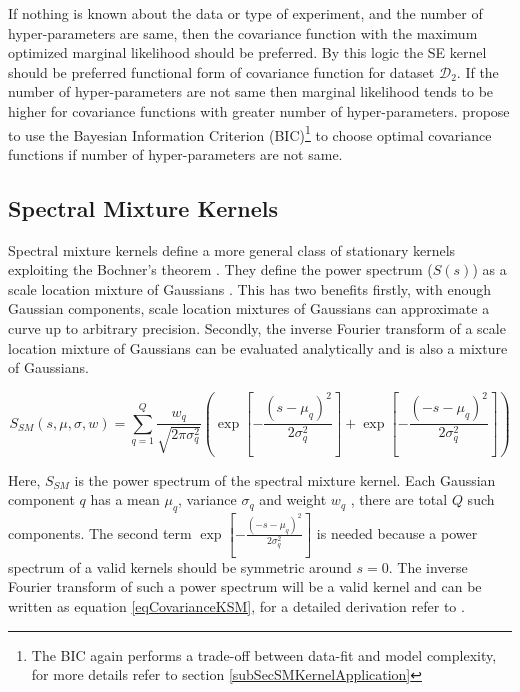 If nothing is known about the data or type of experiment, and the number of hyper-parameters are same, then the covariance function with the maximum optimized marginal likelihood should be preferred. By this logic the SE kernel should be preferred functional form of covariance function for dataset $\mathcal{D}_{2}$. If the number of hyper-parameters are not same then marginal likelihood tends to be higher for covariance functions with greater number of hyper-parameters. \cite{duvenaud-thesis-2014, lloyd2014automatic} propose to use the Bayesian Information Criterion (BIC)\footnote{The BIC again performs a trade-off between data-fit and model complexity, for more details refer to section \ref{subSecSMKernelApplication}} to choose optimal covariance functions if number of hyper-parameters are not same. 

\subsection{Spectral Mixture Kernels}\label{subSecSMKernel}
Spectral mixture kernels define a more general class of stationary kernels exploiting the Bochner's theorem \cite{bochner1959lectures}. They define the power spectrum ($S(s)$) as a scale location mixture of Gaussians \cite{wilson2013gaussian}. This has two benefits firstly, with enough Gaussian components, scale location mixtures of Gaussians can approximate a curve up to arbitrary precision\cite{kostantinos2000gaussian, bishop2006pattern}. Secondly, the inverse Fourier transform of a scale location mixture of Gaussians can be evaluated analytically and is also a mixture of Gaussians.

\begin{equation}\label{eqPowerSpectrumSSM}
    S_{SM}(s, \mu, \sigma, w) = \sum_{q=1}^{Q} \frac{w_{q}}{\sqrt{2\pi\sigma_{q}^2}}
\left ( \exp\left [ {-\frac{{(s-\mu_{q})^2}}{2\sigma_{q}^{2}}} \right ] + \exp\left [ {-\frac{{(-s-\mu_{q})^2}}{2\sigma_{q}^{2}}} \right ] \right  )
\end{equation}

Here, $ S_{SM}$ is the power spectrum of the spectral mixture kernel. Each Gaussian  component $q$ has a mean $\mu_{q}$, variance $\sigma_{q}$ and weight $w_{q}$ , there are total $Q$ such components. The second term $\exp\left [ {-\frac{{(-s-\mu_{q})^2}}{2\sigma_{q}^{2}}} \right ]$ is needed because a power spectrum of a valid kernels should be symmetric around $s=0$. The inverse Fourier transform of such a power spectrum will be a valid kernel and can be written as equation \ref{eqCovarianceKSM}, for a detailed derivation refer to \cite{wilson2014thesis}.

